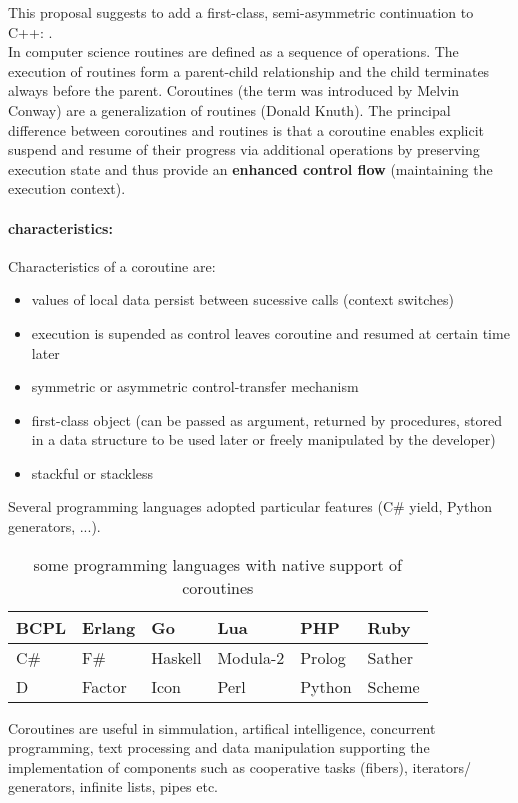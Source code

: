 
This proposal suggests to add a first-class, semi-asymmetric continuation to
C++: \coro.\\
\newline
In computer science routines are defined as a sequence of operations. The
execution of routines form a parent-child relationship and the child terminates
always before the parent. Coroutines (the term was introduced by Melvin
Conway\cite{Conway1963}) are a generalization of routines (Donald
Knuth\cite{Knuth1997}). The principal difference between coroutines and routines
is that a coroutine enables explicit suspend and resume of their progress via
additional operations by preserving execution state and thus provide an
{\bf enhanced control flow} (maintaining the execution context).\\

\paragraph*{characteristics:}
Characteristics\cite{Moura2009} of a coroutine are:
\begin{itemize}
    \item values of local data persist between sucessive calls (context
          switches)
    \item execution is supended as control leaves coroutine and resumed at
          certain time later
    \item symmetric or asymmetric control-transfer mechanism
    \item first-class object (can be passed as argument, returned by procedures,
          stored in a data structure to be used later or freely manipulated by
          the developer)
    \item stackful or stackless
\end{itemize}

Several programming languages adopted particular features (C\# yield, Python
generators, ...).
\begin{table}[h]
    \centering
    \begin{tabular}{ l l l l l l }
        \midrule
        BCPL    &   Erlang  &   Go      &   Lua         &   PHP     &   Ruby \\
        \midrule
        C\#     &   F\#     &   Haskell &   Modula-2    &   Prolog  &   Sather \\
        \midrule
        D       &   Factor  &   Icon    &   Perl        &   Python  &   Scheme \\
        \midrule
    \end{tabular}
    \caption{some programming languages with native support of coroutines}
\end{table}
\newline
Coroutines are useful in simmulation, artifical intelligence, concurrent
programming, text processing and data manipulation\cite{Moura2009} supporting
the implementation of components such as cooperative tasks (fibers), iterators/
generators, infinite lists, pipes etc.

